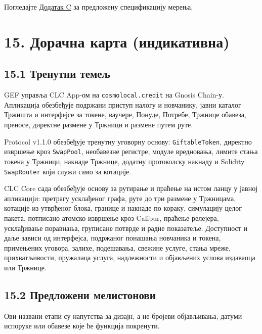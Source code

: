 \documentclass[11pt]{article}
\begin{document}
Погледајте \href{https://docs.cosmolocal.credit/sr/white-paper/appendix-c-kpi-definitions}{Додатак C} за предложену спецификацију мерења.


\section*{15. Дорачна карта (индикативна)}

\subsection*{15.1 Тренутни темељ}

GEF управља CLC App-ом на \texttt{cosmolocal.credit} на Gnosis Chain-у. Апликација обезбеђује подржани приступ налогу и новчанику, јавни каталог Тржишта и интерфејсе за токене, ваучере, Понуде, Потребе, Тржнице обавеза, преносе, директне размене у Тржници и размене путем руте.

Protocol v1.1.0 обезбеђује тренутну уговорну основу: \texttt{GiftableToken}, директно извршење кроз \texttt{SwapPool}, необавезне регистре, модуле вредновања, лимите стања токена у Тржници, накнаде Тржнице, додатну протоколску накнаду и Solidity \texttt{SwapRouter} који служи само за котације.

CLC Core сада обезбеђује основу за рутирање и праћење на истом ланцу у јавној апликацији: претрагу усклађеног графа, руте до три размене у Тржницама, котације из утврђеног блока, границе и накнаде по кораку, симулацију целог пакета, потписано атомско извршење кроз Calibur, праћење релејера, усклађивање поравнања, груписане потврде и радне показатеље. Доступност и даље зависи од интерфејса, подржаног понашања новчаника и токена, примењених уговора, залихе, подешавања, свежине услуге, стања мреже, прихватљивости, пружалаца услуга, надлежности и објављених услова издаваоца или Тржнице.

\subsection*{15.2 Предложени мелистонови}

Ови названи етапи су напутства за дизајн, а не бројеви објављивања, датуми испоруке или обавезе које ће функција покренути.
\end{document}
